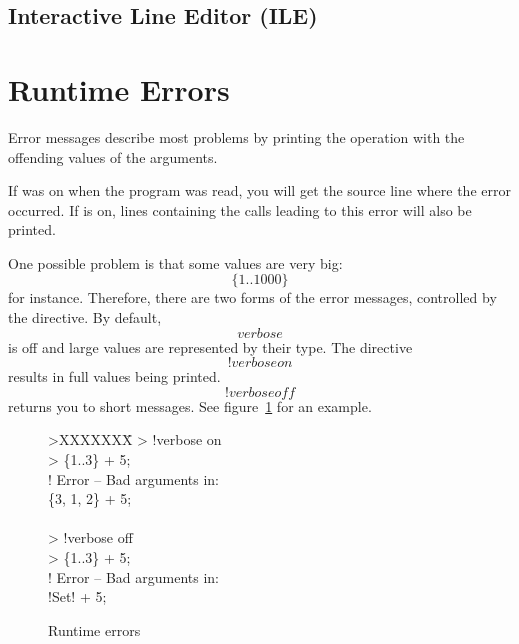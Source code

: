 {\subsection{Interactive Line Editor (ILE)}


    
\pagebreak
\section{Runtime Errors}\label{secRT}

    Error messages describe most problems by printing the
    operation with the offending values of the arguments.

    If  was on when the program was read, you will get the
    source line where the error occurred.
    If  is on, lines containing the calls leading to this
    error will also be printed.
    
    One possible problem is that some values are very big:
    \[\{1..1000\}\] for instance.  Therefore, there are two forms of the
    error messages, controlled by the  directive.  By
    default, \[verbose\] is off and large values are represented by
    their type.  The directive \[!verbose on\] results in full values
    being printed. 
    \[!verbose off\] returns you to short messages.
    See figure~\ref{RT} for an example.

    \begin{figure}[hbp]
	\DS
	    >XXXXXXX\=\kill
	    >	    \>!verbose on\\
	    >	    \>\{1..3\} + 5;\\
	    ! Error -- Bad arguments in:\\
	    \{3, 1, 2\} + 5;\\
\\
	    >	    \>!verbose off\\
	    >	    \>\{1..3\} + 5;\\
	    ! Error -- Bad arguments in:\\
	    !Set! + 5;
	\DE
	\caption{Runtime errors\label{RT}}
    \end{figure}

\pagebreak[0]
{\samepage
}}
